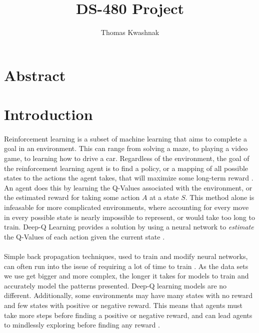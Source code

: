 \documentclass[12pt]{article}
\author{Thomas Kwashnak}
\title{DS-480 Project}
\begin{document}
\maketitle

\newpage

\section{Abstract}

\section{Introduction}



\paragraph{}

Reinforcement learning is a subset of machine learning that aims to complete a goal in an environment.
This can range from solving a maze, to playing a video game, to learning how to drive a car.
Regardless of the environment, the goal of the reinforcement learning agent is to find a policy, or a mapping of all possible states to the actions the agent takes, that will maximize some long-term reward \cite{article_reinforcement_learning_survey}.
An agent does this by learning the Q-Values associated with the environment, or the estimated reward for taking some action $A$ at a state $S$.
This method alone is infeasable for more complicated environments, where accounting for every move in every possible state is nearly impossible to represent, or would take too long to train.
Deep-Q Learning provides a solution by using a neural network to \textit{estimate} the Q-Values of each action given the current state \cite{article_human_level_control_deep_reinforcement_learning}.


\paragraph{}
Simple back propagation techniques, used to train and modify neural networks, can often run into the issue of requiring a lot of time to train \cite{article_accelerating_neural_networks_weight_extrapolations}.
As the data sets we use get bigger and more complex, the longer it takes for models to train and accurately model the patterns presented.
Deep-Q learning models are no different.
Additionally, some environments may have many states with no reward and few states with positive or negative reward.
This means that agents must take more steps before finding a positive or negative reward, and can lead agents to mindlessly exploring before finding any reward \cite{article_approx_optimal_approximate_reinforcement_learning}.
\end{document}
